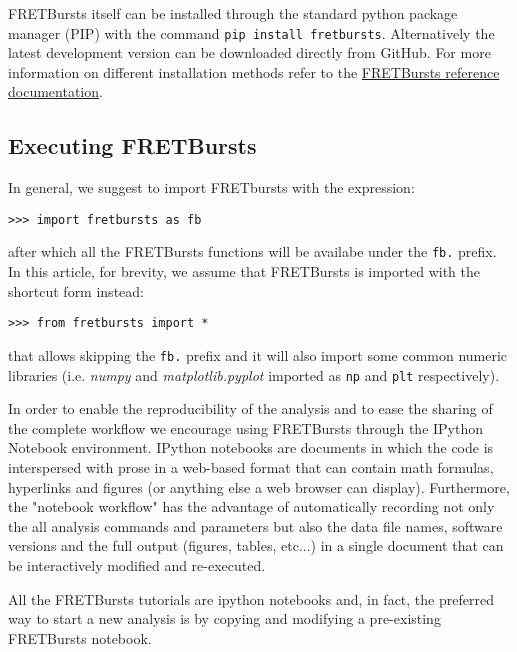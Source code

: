 FRETBursts itself can be installed through the standard python package manager (PIP)
with the command \texttt{pip install fretbursts}. 
Alternatively the latest development version can be downloaded directly 
from GitHub. For more information on different installation methods refer
to the 
\href{http://fretbursts.readthedocs.org/en/latest/installation.html}{FRETBursts reference documentation}.

\subsection{Executing FRETBursts}
\label{sec:import}
In general, we suggest to import FRETbursts with the expression:

\begin{verbatim}
>>> import fretbursts as fb
\end{verbatim}

after which all the FRETBursts functions will be availabe under the \verb|fb.|
prefix. In this article, for brevity, we assume that FRETBursts is imported 
with the shortcut form instead:

\begin{verbatim}
>>> from fretbursts import *
\end{verbatim}

that allows skipping the \verb|fb.| prefix and it will also import some common 
numeric libraries (i.e. \textit{numpy} and \textit{matplotlib.pyplot} 
imported as \verb|np| and \verb|plt| respectively).

In order to enable the reproducibility of the analysis and to ease
the sharing of the complete workflow we encourage using FRETBursts through 
the IPython Notebook environment. 
IPython notebooks are documents in which the code is interspersed with 
prose in a web-based format that can contain math formulas, hyperlinks 
and figures (or anything else a web browser can display).
Furthermore, the "notebook workflow"\cite{Shen_2014} has the advantage 
of automatically recording not only the all analysis commands and parameters 
but also the data file names, software versions and the full output 
(figures, tables, etc...) in a single document that can be interactively 
modified and re-executed.

All the FRETBursts tutorials are 
ipython notebooks and, in fact, the preferred way to start a new analysis is by 
copying and modifying a pre-existing FRETBursts notebook.
